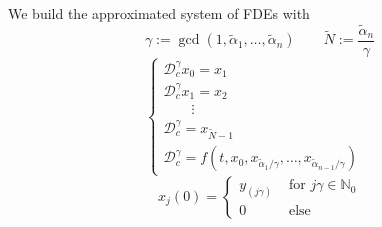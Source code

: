     We build the approximated system of FDEs with \[\gamma :=\operatorname{gcd}\left(1, \tilde{\alpha}_{1}, \ldots, \tilde{\alpha}_{n}\right)\qquad\tilde{N} :=\frac{\tilde{\alpha}_{n}}{\gamma}\]
    \begin{equation}
    \begin{cases}
    
    \mathcal{D}_c^{\gamma} x_{0} =x_{1} &\\[5pt]
    \mathcal{D}_c^{\gamma} x_{1} =x_{2} &\\
    \qquad\vdots &\\
    \mathcal{D}_c^{\gamma} =x_{\tilde{N}-1} &\\[5pt]
    \mathcal{D}_c^{\gamma} =f\left(t, x_{0}, x_{\tilde{\alpha}_{1} / \gamma}, \ldots, x_{\tilde{\alpha}_{n-1} / \gamma}\right) \end{cases}
    \end{equation}
    \begin{equation}
    x _ { j } ( 0 ) = \begin{cases} { y _ { ( j \gamma ) }   } & { \text { for } j \gamma \in \mathbb { N } _ { 0 } } \\ { 0  } & { \text { else } } \end{cases}
    \end{equation}
